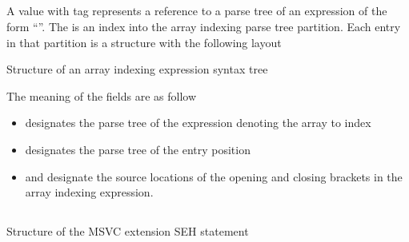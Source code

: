 

\subsection{}
\label{sec:ifc:SyntaxSort:ArrayIndex}

A  value with tag  represents a reference
to a parse tree of an expression of the form ``''.  
The  is an index into the array indexing parse tree
partition. Each entry in that partition is a structure with the following layout
%
\begin{Structure}
	\caption{Structure of an array indexing expression syntax tree}
	\label{fig:ifc:SyntaxSort:ArrayIndex}
\end{Structure}
%
The meaning of the fields are as follow
\begin{itemize}
	\item {} designates the parse tree of the expression denoting the array to index
	\item {} designates the parse tree of the entry position
	\item {} and  designate the source locations 
	of the opening and closing brackets in the array indexing expression.
\end{itemize}


\subsection{}
\label{sec:ifc:SyntaxSort:SEHTry}

\begin{Structure}
	\caption{Structure of the MSVC extension SEH  statement}
	\label{fig:ifc:SyntaxSort:SEHTry}
\end{Structure}

